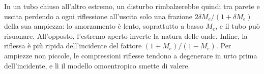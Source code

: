 \documentclass[11pt,a4paper]{article}
\newcommand{\Me}{M_e}
\begin{document}
In un tubo chiuso all'altro estremo, un disturbo rimbalzerebbe quindi tra parete e uscita perdendo a ogni
riflessione all'uscita solo una frazione $2\delta\Me/(1+\delta\Me)$ della sua ampiezza: lo smorzamento è lento,
soprattutto a basso $\Me$, e il tubo può risuonare. All'opposto, l'estremo aperto inverte la natura delle onde.
Infine, la riflessa è più ripida dell'incidente del fattore $(1+\Me)/(1-\Me)$. Per ampiezze non piccole, le
compressioni riflesse tendono a degenerare in urto prima dell'incidente, e lì il modello omoentropico smette di
valere.
\end{document}
